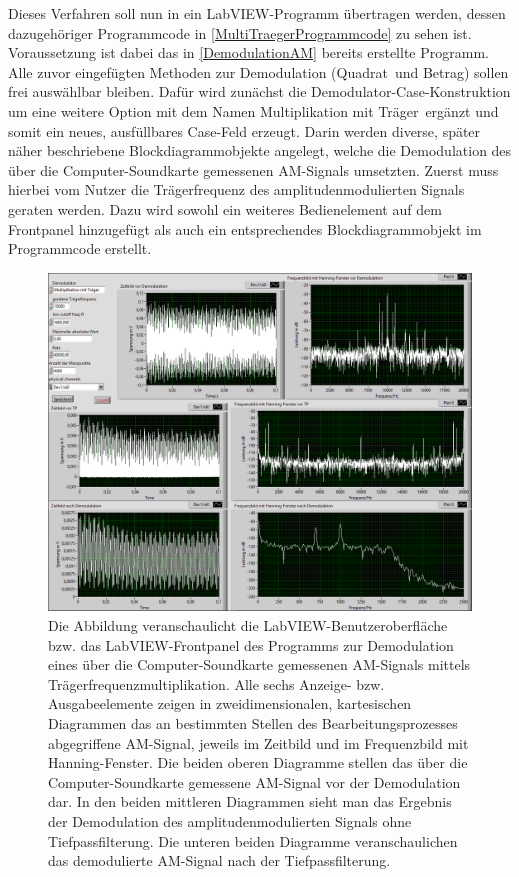 \documentclass[
a4paper,
12pt,
pagesize,
ngerman
]{scrartcl}
\begin{document}
	Dieses Verfahren soll nun in ein LabVIEW-Programm übertragen werden, dessen dazugehöriger Programmcode in \ref{MultiTraegerProgrammcode} zu sehen ist. 
	Voraussetzung ist dabei das in \cref{DemodulationAM} bereits erstellte Programm.
	Alle zuvor eingefügten Methoden zur Demodulation (\glqq Quadrat\grqq\ und \glqq Betrag\grqq ) sollen frei auswählbar bleiben.
	Dafür wird zunächst die Demodulator-Case-Konstruktion um eine weitere Option mit dem Namen \glqq Multiplikation mit Träger\grqq\ ergänzt und somit ein neues, ausfüllbares Case-Feld erzeugt.
	Darin werden diverse, später näher beschriebene Blockdiagrammobjekte angelegt, welche die Demodulation des über die Computer-Soundkarte gemessenen AM-Signals umsetzten.
	Zuerst muss hierbei vom Nutzer die Trägerfrequenz des amplitudenmodulierten Signals geraten werden.
	Dazu wird sowohl ein weiteres Bedienelement auf dem Frontpanel hinzugefügt als auch ein entsprechendes Blockdiagrammobjekt im Programmcode erstellt. %
	
	\begin{figure}[H]
		\centering
		\includegraphics[width=1.0\textwidth]{EIRE2018Dateien/Tag4/traegerMultOszi/Oszilloskop__modifiziertp}
		\caption{Die Abbildung veranschaulicht die LabVIEW-Benutzeroberfläche bzw. das LabVIEW-Frontpanel des Programms zur Demodulation eines über die Computer-Soundkarte gemessenen AM-Signals mittels Trägerfrequenzmultiplikation. Alle sechs Anzeige- bzw. Ausgabeelemente zeigen in zweidimensionalen, kartesischen Diagrammen das an bestimmten Stellen des Bearbeitungsprozesses abgegriffene AM-Signal, jeweils im Zeitbild und im Frequenzbild mit Hanning-Fenster. Die beiden oberen Diagramme stellen das über die Computer-Soundkarte gemessene AM-Signal vor der Demodulation dar. In den beiden mittleren Diagrammen sieht man das Ergebnis der Demodulation des amplitudenmodulierten Signals ohne Tiefpassfilterung. Die unteren beiden Diagramme veranschaulichen das demodulierte AM-Signal nach der Tiefpassfilterung.}
		\label{MultiTraegerFrontpanel}
	\end{figure}
\end{document}
